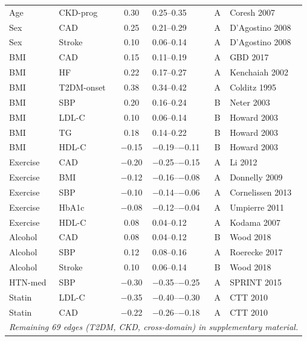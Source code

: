 \documentclass[runningheads]{llncs}
\begin{document}
{\begin{longtable}{@{}p{2.0cm}p{2.0cm}cp{1.4cm}cp{2.8cm}@{}}
Age & CKD-prog & 0.30 & 0.25--0.35 & A & Coresh 2007 \\
Sex & CAD & 0.25 & 0.21--0.29 & A & D'Agostino 2008 \\
Sex & Stroke & 0.10 & 0.06--0.14 & A & D'Agostino 2008 \\
BMI & CAD & 0.15 & 0.11--0.19 & A & GBD 2017 \\
BMI & HF & 0.22 & 0.17--0.27 & A & Kenchaiah 2002 \\
BMI & T2DM-onset & 0.38 & 0.34--0.42 & A & Colditz 1995 \\
BMI & SBP & 0.20 & 0.16--0.24 & B & Neter 2003 \\
BMI & LDL-C & 0.10 & 0.06--0.14 & B & Howard 2003 \\
BMI & TG & 0.18 & 0.14--0.22 & B & Howard 2003 \\
BMI & HDL-C & $-$0.15 & $-$0.19--$-$0.11 & B & Howard 2003 \\
Exercise & CAD & $-$0.20 & $-$0.25--$-$0.15 & A & Li 2012 \\
Exercise & BMI & $-$0.12 & $-$0.16--$-$0.08 & A & Donnelly 2009 \\
Exercise & SBP & $-$0.10 & $-$0.14--$-$0.06 & A & Cornelissen 2013 \\
Exercise & HbA1c & $-$0.08 & $-$0.12--$-$0.04 & A & Umpierre 2011 \\
Exercise & HDL-C & 0.08 & 0.04--0.12 & A & Kodama 2007 \\
Alcohol & CAD & 0.08 & 0.04--0.12 & B & Wood 2018 \\
Alcohol & SBP & 0.12 & 0.08--0.16 & A & Roerecke 2017 \\
Alcohol & Stroke & 0.10 & 0.06--0.14 & B & Wood 2018 \\
HTN-med & SBP & $-$0.30 & $-$0.35--$-$0.25 & A & SPRINT 2015 \\
Statin & LDL-C & $-$0.35 & $-$0.40--$-$0.30 & A & CTT 2010 \\
Statin & CAD & $-$0.22 & $-$0.26--$-$0.18 & A & CTT 2010 \\
\midrule
\multicolumn{6}{c}{\small\itshape Remaining 69 edges (T2DM, CKD, cross-domain) in supplementary material.} \\
\end{longtable}
}
\end{document}

